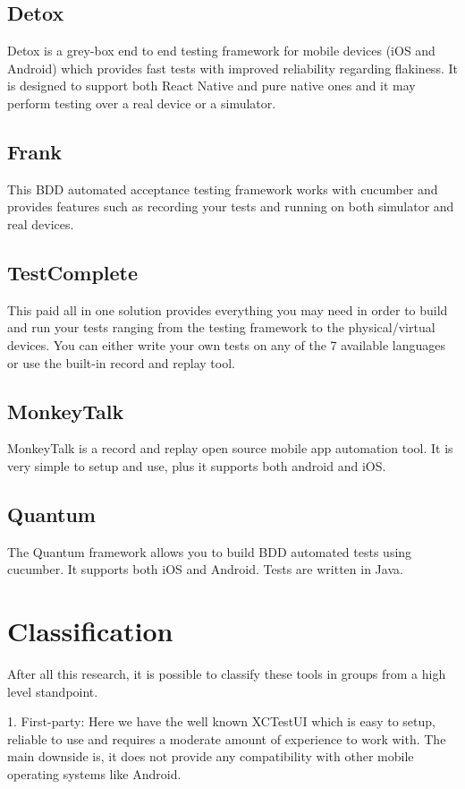 \subsection {Detox}
Detox is a grey-box end to end testing framework for mobile devices (iOS and Android) which provides fast tests with improved reliability regarding flakiness. It is designed to support both React Native and pure native ones and it may perform testing over a real device or a simulator.

\subsection {Frank}
This BDD automated acceptance testing framework works with cucumber and provides features such as recording your tests and running on both simulator and real devices.

\subsection {TestComplete}
This paid all in one solution provides everything you may need in order to build and run your tests ranging from the testing framework to the physical/virtual devices. You can either write your own tests on any of the 7 available languages or use the built-in record and replay tool.

\subsection {MonkeyTalk}
MonkeyTalk is a record and replay open source mobile app automation tool. It is very simple to setup and use, plus it supports both android and iOS.

\subsection {Quantum}
The Quantum framework allows you to build BDD automated tests using cucumber. It supports both iOS and Android. Tests are written in Java.

\section{Classification}
After all this research, it is possible to classify these tools in groups from a high level standpoint.

1. First-party: Here we have the well known XCTestUI which is easy to setup, reliable to use and requires a moderate amount of experience to work with. The main downside is, it does not provide any compatibility with other mobile operating systems like Android.

